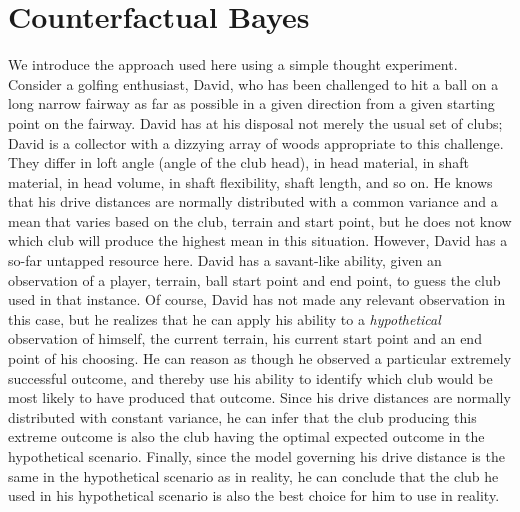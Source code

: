 \documentclass[12pt]{article}
\begin{document}
\section{Counterfactual Bayes}\label{counterfactual_bayes}
%
We introduce the approach used here using a simple thought experiment.
%
Consider a golfing enthusiast, David, who has been challenged to hit a ball on a long narrow fairway as far as possible in a given direction from a given starting point on the fairway. 
%
David has at his disposal not merely the usual set of clubs; David is a collector with a dizzying array of woods appropriate to this challenge.
%
They differ in loft angle (angle of the club head), in head material, in shaft material, in head volume, in shaft flexibility, shaft length, and so on. 
%
He knows that his drive distances are normally distributed with a common variance and a mean that varies based on the club, terrain and start point, but he does not know which club will produce the highest mean in this situation.
%
%
However, David has a so-far untapped resource here.
%
David has a savant-like ability, given an observation of a player, terrain, ball start point and end point, to guess the club used in that instance. 
%
Of course, David has not made any relevant observation in this case, but he realizes that he can apply his ability to a \textit{hypothetical} observation of himself, the current terrain, his current start point and an end point of his choosing. 
%
He can reason as though he observed a particular extremely successful outcome, and thereby use his ability to identify which club would be most likely to have produced that outcome.
%
Since his drive distances are normally distributed with constant variance, he can infer that the club producing this extreme outcome is also the club having the optimal expected outcome in the hypothetical scenario.
%
Finally, since the model governing his drive distance is the same in the hypothetical scenario as in reality, he can conclude that the club he used in his hypothetical scenario is also the best choice for him to use in reality.
%
\end{document}
